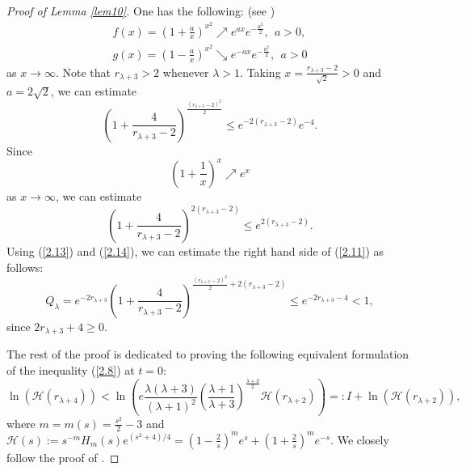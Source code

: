 \documentclass{amsart}
\theoremstyle{Corollary}
\numberwithin{equation}{section}
\begin{document}
\begin{proof}[Proof of Lemma \ref{lem10}]
One has the following: (see \cite[Appendix]{Drugan&Nguyen})
\begin{equation}\label{2.12}
\begin{split}
f(x)=\left(1+\frac{a}{x}\right)^{x^2}\nearrow e^{ax}e^{-\frac{a^2}{2}},~~a>0,\\
g(x)=\left(1-\frac{a}{x}\right)^{x^2}\searrow e^{-ax}e^{-\frac{a^2}{2}},~~a>0
\end{split}
\end{equation}
as $x\to\infty$. Note that $r_{\lambda+3}>2$ whenever $\lambda>1$.
Taking $x=\displaystyle\frac{r_{\lambda+3}-2}{\sqrt{2}}>0$
and $a=2\sqrt{2}$, we can estimate
\begin{equation}\label{2.13}
\left(1+\frac{4}{r_{\lambda+3}-2}\right)^{\frac{(r_{\lambda+3}-2)^2}{2}}
\leq e^{-2(r_{\lambda+3}-2)}e^{-4}.
\end{equation}
Since
$$\left(1+\frac{1}{x}\right)^x\nearrow e^x$$
as $x\to\infty$, we can estimate
\begin{equation}\label{2.14}
\left(1+\frac{4}{r_{\lambda+3}-2}\right)^{2(r_{\lambda+3}-2)}
\leq e^{2(r_{\lambda+3}-2)}.
\end{equation}
Using (\ref{2.13}) and (\ref{2.14}),
we can estimate the right hand side of (\ref{2.11})
as follows:
\begin{equation*}
Q_\lambda=e^{-2r_{\lambda+3}}
\left(1+\frac{4}{r_{\lambda+3}-2}\right)^{\frac{(r_{\lambda+3}-2)^2}{2}+2(r_{\lambda+3}-2)}
\leq e^{-2r_{\lambda+3} -4}<1,
\end{equation*}
since $2r_{\lambda+3}+4\geq 0$.

The rest of the proof is dedicated to proving
the following equivalent formulation of the inequality
(\ref{2.8}) at $t=0$:
\begin{equation}\label{2.15}
\ln(\mathcal{H}(r_{\lambda+4}))<\ln\left(e\frac{\lambda(\lambda+3)}{(\lambda+1)^2}\left(\frac{\lambda+1}{\lambda+3}\right)^{\frac{\lambda+3}{2}}\mathcal{H}(r_{\lambda+2})\right)=:I+\ln(\mathcal{H}(r_{\lambda+2})),
\end{equation}
where $m=m(s)=\frac{s^2}{2}-3$ and $\mathcal{H}(s):=s^{-m}H_m(s)e^{(s^2+4)/4}
=(1-\frac{2}{s})^{m}e^s+(1+\frac{2}{s})^{m}e^{-s}$.
We closely follow the proof of \cite[Proposition 9]{Drugan&Nguyen}.


\end{proof}
\end{document}

